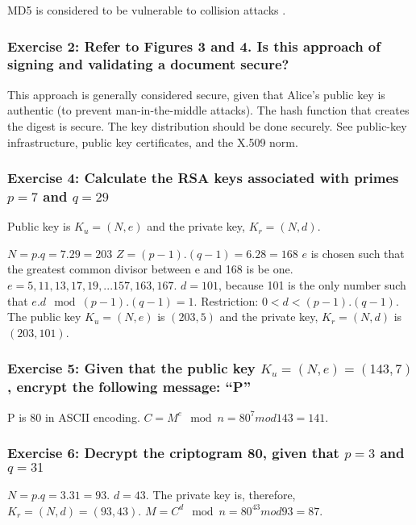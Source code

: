 \documentclass[12pt,a4paper]{article}
\begin{document}
MD5 is considered to be vulnerable to collision attacks \cite{wang2005}.


\subsubsection*{Exercise 2: Refer to Figures 3 and 4. Is this approach of signing and validating a document secure?}

This approach is generally considered secure, given that Alice's public key is authentic (to prevent man-in-the-middle attacks). The hash function that creates the digest is secure. The key distribution should be done securely. See public-key infrastructure, public key certificates, and the X.509 norm.

\subsubsection*{Exercise 4: Calculate the RSA keys associated with primes $p = 7$ and $q = 29$}
Public key is $K_u = (N,e)$ and the private key, $K_r = (N,d)$.

$N = p.q = 7.29 = 203$
$Z = (p - 1).(q - 1) = 6.28 = 168$
$e$ is chosen such that the greatest common divisor between e and 168 is be one.
$e = 5, 11, 13, 17, 19, ... 157, 163, 167$.
$d = 101$, because 101 is the only number such that $e.d \mod (p - 1).(q - 1) = 1$. Restriction: $0 < d < (p - 1).(q - 1)$.
The public key $K_u = (N,e)$ is $(203, 5)$ and the private key, $K_r = (N,d)$ is $(203,101)$.

\subsubsection*{Exercise 5: Given that the public key $K_u = (N,e) = (143, 7)$, encrypt the following message: ``P''}
P is 80 in ASCII encoding.
$C = M^e \mod n = 80^7 mod 143 = 141$.

\subsubsection*{Exercise 6: Decrypt the criptogram 80, given that $p = 3$ and $q = 31$ }
$N = p.q = 3.31 = 93$.
$d = 43$.
The private key is, therefore, $K_r = (N,d) = (93,43)$.
$M = C^d \mod n = 80^43 mod 93 = 87$.





\end{document}
